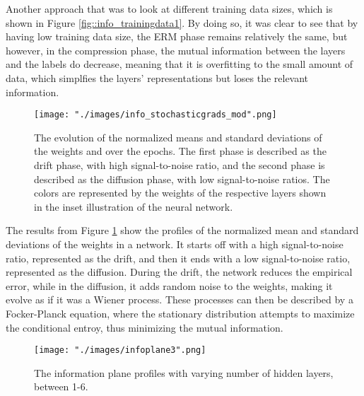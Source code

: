Another approach that was to look at different training data sizes, which is shown in Figure \ref{fig::info_trainingdata1}. By doing so, it was clear to see that by having low training data size, the ERM phase remains relatively the same, but however, in the compression phase, the mutual information between the layers and the labels do decrease, meaning that it is overfitting to the small amount of data, which simplfies the layers' representations but loses the relevant information.


\begin{figure}[ht]
\begin{center}
    \texttt{[image: "./images/info\_stochasticgrads\_mod".png]}
    \caption{The evolution of the normalized means and standard deviations of the weights and over the epochs. The first phase is described as the drift phase, with high signal-to-noise ratio, and the second phase is described as the diffusion phase, with low signal-to-noise ratios. The colors are represented by the weights of the respective layers shown in the inset illustration of the neural network.}
    \label{fig::info_sgd}
\end{center}
\end{figure}

The results from Figure \ref{fig::info_sgd} show the profiles of the normalized mean and standard deviations of the weights in a network. It starts off with a high signal-to-noise ratio, represented as the drift, and then it ends with a low signal-to-noise ratio, represented as the diffusion. During the drift, the network reduces the empirical error, while in the diffusion, it adds random noise to the weights, making it evolve as if it was a Wiener process. These processes can then be described by a Focker-Planck equation, where the stationary distribution attempts to maximize the conditional entroy, thus minimizing the mutual information.

\begin{figure}[ht]
\begin{center}
    \texttt{[image: "./images/infoplane3".png]}
    \caption{The information plane profiles with varying number of hidden layers, between 1-6.}
    \label{fig::info_varlayers}
\end{center}
\end{figure}

